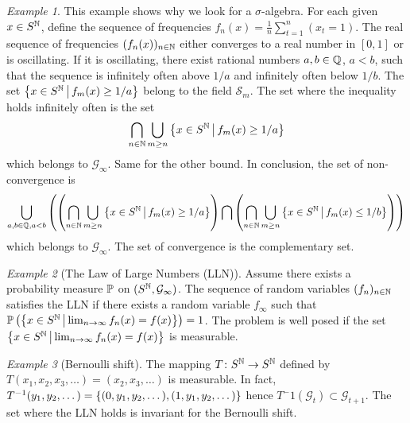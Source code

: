 \documentclass[12pt,a4paper]{amsart}
\theoremstyle{plain}%
\theoremstyle{definition}
\theoremstyle{remark}
\newtheorem{example}{Example}
\begin{document}
\begin{example} This example shows why we look for a
  $\sigma$-algebra. For each given $x \in S^{\mathbb{N}}$, define the sequence
  of frequencies $f_n(x) = \frac 1 n \sum_{t=1}^n (x_t=1)$. The real
  sequence of frequencies $(f_n(x))_{n\in\mathbb{N}}$ either converges to a
  real number in $[0,1]$ or is oscillating. If it is oscillating,
  there exist rational numbers $a,b \in \mathbb{Q}$, $a < b$, such that the sequence is infinitely often above $1/a$ and infinitely often below $1/b$. The set $\left\{x \in S^{\mathbb{N}} \, \middle| \, f_m(x) \geq 1/a \right\}$ belong to the field $\mathcal S_m$. The set where the inequality holds infinitely often is the set
\begin{equation*}
  \bigcap_{n\in\mathbb{N}} \bigcup_{m \geq n
    }\left\{x \in S^{\mathbb{N}} \, \middle| \, f_m(x) \geq 1/a \right\} 
\end{equation*}
which belongs to $\mathcal G_\infty$. Same for the other bound. In conclusion, the set of non-convergence is
\begin{equation*}
  \bigcup_{a,b\in\mathbb{Q},a<b}  \left(\left(\bigcap_{n\in\mathbb{N}} \bigcup_{m \geq n
    }\left\{x \in S^{\mathbb{N}} \, \middle| \, f_m(x) \geq 1/a \right\}\right) \bigcap  \left(\bigcap_{n\in\mathbb{N}} \bigcup_{m \geq n
    }\left\{x \in S^{\mathbb{N}} \, \middle| \, f_m(x) \leq 1/b \right\} \right)\right)
\end{equation*}
which belongs to $\mathcal G_\infty$. The set of convergence is the complementary set. 
\end{example}

\bigskip

\begin{example}[The Law of Large Numbers (LLN)] Assume there exists a probability measure $\operatorname{\mathbb P}$ on $(S^{\mathbb{N}},\mathcal G_\infty)$. The sequence of random variables $(f_n)_{n \in\mathbb{N}}$ satisfies the LLN if there exists a random variable $f_\infty$ such that $\operatorname{\mathbb P}\left(\left\{x \in S^{\mathbb{N}} \, \middle| \, \lim_{n\to\infty} f_n(x) = f(x) \right\}\right) = 1$. The problem is well posed if the set $\left\{x \in S^{\mathbb{N}} \, \middle| \, \lim_{n\to\infty} f_n(x) = f(x) \right\}$ is measurable. 
\end{example}

\bigskip

\begin{example}[Bernoulli shift] The mapping $T \colon S^{\mathbb{N}} \to S^{\mathbb{N}}$ defined by $T(x_1,x_2,x_3,\dots) = (x_2,x_3,\dots)$ is measurable. In fact, $T^{-1}(y_1,y_2,\dots) = \left\{(0,y_1,y_2,\dots),(1,y_1,y_2,\dots)\right\}$ hence $T^-1(\mathcal G_t) \subset \mathcal G_{t+1}$. The set where the LLN holds is invariant for the Bernoulli shift.  
\end{example}
\end{document}
